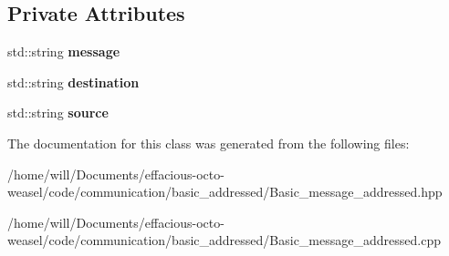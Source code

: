 \subsection*{Private Attributes}
\begin{DoxyCompactItemize}
\item 
std\+::string {\bfseries message}\hypertarget{class_basic__message__addressed_aff938f855fbf89de5ded4eacdf3d1209}{}\label{class_basic__message__addressed_aff938f855fbf89de5ded4eacdf3d1209}

\item 
std\+::string {\bfseries destination}\hypertarget{class_basic__message__addressed_a4210300c97bb3f9ec9537d50b53dd886}{}\label{class_basic__message__addressed_a4210300c97bb3f9ec9537d50b53dd886}

\item 
std\+::string {\bfseries source}\hypertarget{class_basic__message__addressed_a4ca8307b924c1e8afa567839cc1989da}{}\label{class_basic__message__addressed_a4ca8307b924c1e8afa567839cc1989da}

\end{DoxyCompactItemize}


The documentation for this class was generated from the following files\+:\begin{DoxyCompactItemize}
\item 
/home/will/\+Documents/effacious-\/octo-\/weasel/code/communication/basic\+\_\+addressed/Basic\+\_\+message\+\_\+addressed.\+hpp\item 
/home/will/\+Documents/effacious-\/octo-\/weasel/code/communication/basic\+\_\+addressed/Basic\+\_\+message\+\_\+addressed.\+cpp\end{DoxyCompactItemize}
